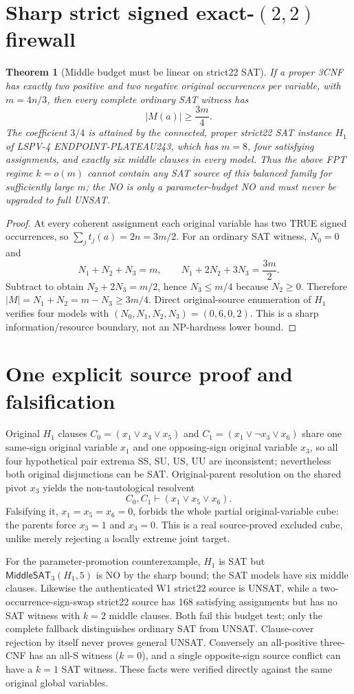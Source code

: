 \documentclass[10pt]{article}
\newtheorem{theorem}{Theorem}
\begin{document}
\section{Sharp strict signed exact-$(2,2)$ firewall}
\begin{theorem}[Middle budget must be linear on strict22 SAT]
If a proper 3CNF has exactly two positive and two negative original occurrences per variable, with $m=4n/3$, then \emph{every} complete ordinary SAT witness has
\[
 \boxed{|M(a)|\ge \frac{3m}{4}}.
\]
The coefficient $3/4$ is attained by the connected, proper strict22 SAT instance $H_1$ of LSPV-4 ENDPOINT-PLATEAU243, which has $m=8$, four satisfying assignments, and exactly six middle clauses in every model. Thus the above FPT regime $k=o(m)$ cannot contain \emph{any} SAT source of this balanced family for sufficiently large $m$; the NO is only a parameter-budget NO and must never be upgraded to full UNSAT.
\end{theorem}
\begin{proof}
At every coherent assignment each original variable has two TRUE signed occurrences, so $\sum_j t_j(a)=2n=3m/2$. For an ordinary SAT witness, $N_0=0$ and
\[
 N_1+N_2+N_3=m,\qquad N_1+2N_2+3N_3=\frac{3m}{2}.
\]
Subtract to obtain $N_2+2N_3=m/2$, hence $N_3\le m/4$ because $N_2\ge0$. Therefore $|M|=N_1+N_2=m-N_3\ge3m/4$. Direct original-source enumeration of $H_1$ verifies four models with $(N_0,N_1,N_2,N_3)=(0,6,0,2)$. This is a sharp information/resource boundary, not an NP-hardness lower bound.
\end{proof}

\section{One explicit source proof and falsification}
Original $H_1$ clauses $C_0=(x_1\vee x_3\vee x_5)$ and $C_1=(x_1\vee\neg x_3\vee x_6)$ share one same-sign original variable $x_1$ and one opposing-sign original variable $x_3$, so all four hypothetical pair extrema SS, SU, US, UU are inconsistent; nevertheless both original disjunctions can be SAT. Original-parent resolution on the shared pivot $x_3$ yields the non-tautological resolvent
\[
 C_0,C_1\vdash (x_1\vee x_5\vee x_6).
\]
Falsifying it, $x_1=x_5=x_6=0$, forbids the whole partial original-variable cube: the parents force $x_3=1$ and $x_3=0$. This is a real source-proved excluded cube, unlike merely rejecting a locally extreme joint target.

For the parameter-promotion counterexample, $H_1$ is SAT but $\mathsf{MiddleSAT}_3(H_1,5)$ is NO by the sharp bound; the SAT models have six middle clauses. Likewise the authenticated W1 strict22 source is UNSAT, while a two-occurrence-sign-swap strict22 source has 168 satisfying assignments but has no SAT witness with $k=2$ middle clauses. Both fail this budget test; only the complete fallback distinguishes ordinary SAT from UNSAT. Clause-cover rejection by itself never proves general UNSAT. Conversely an all-positive three-CNF has an all-S witness ($k=0$), and a single opposite-sign source conflict can have a $k=1$ SAT witness. These facts were verified directly against the same original global variables.
\end{document}
